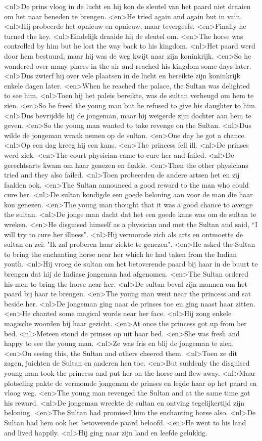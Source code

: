 <nl>De prins vloog in de lucht en hij kon de sleutel van het paard niet draaien om het naar beneden te brengen.
<en>He tried again and again but in vain.
<nl>Hij probeerde het opnieuw en opnieuw, maar tevergeefs.
<en>Finally he turned the key.
<nl>Eindelijk draaide hij de sleutel om.
<en>The horse was controlled by him but he lost the way back to his kingdom.
<nl>Het paard werd door hem bestuurd, maar hij was de weg kwijt naar zijn koninkrijk.
<en>So he wandered over many places in the air and reached his kingdom some days later.
<nl>Dus zwierf hij over vele plaatsen in de lucht en bereikte  zijn koninkrijk enkele dagen later.
<en>When he reached the palace, the Sultan was delighted to see him.
<nl>Toen hij het paleis bereikte, was de sultan verheugd om hem te zien.
<en>So he freed the young man but he refused to give his daughter to him.
<nl>Dus bevrijdde hij de jongeman, maar hij weigerde zijn dochter aan hem te geven.
<en>So the young man wanted to take revenge on the Sultan.
<nl>Dus wilde de jongeman wraak nemen op de sultan.
<en>One day he got a chance.
<nl>Op een dag kreeg hij een kans.
<en>The princess fell ill.
<nl>De prinses werd ziek.
<en>The court physician came to cure her and failed.
<nl>De gerechtsarts kwam om haar genezen en faalde.
<en>Then the other physicians tried and they also failed.
<nl>Toen probeerden de andere artsen het en zij faalden ook.
<en>The Sultan announced a good reward to the man who could cure her.
<nl>De sultan kondigde een goede beloning aan voor de man die haar kon genezen.
<en>The young man thought that it was a good chance to avenge the sultan.
<nl>De jonge man dacht dat het een goede kans was om de sultan te wreken.
<en>He disguised himself as a physician and met the Sultan and said, “I will try to cure her illness".
<nl>Hij vermomde zich als arts en ontmoette de sultan en zei: "Ik zal proberen haar ziekte te genezen".
<en>He asked the Sultan to bring the enchanting horse near her which he had taken from the Indian youth.
<nl>Hij vroeg de sultan om het betoverende paard bij haar in de buurt te brengen dat hij de Indiase jongeman had afgenomen.
<en>The Sultan ordered his men to bring the horse near her.
<nl>De sultan beval zijn mannen om het paard bij haar te brengen.
<en>The young man went near the princess and sat beside her.
<nl>De jongeman ging naar de prinses toe en ging naast haar zitten.
<en>He chanted some magical words near her face.
<nl>Hij zong enkele magische woorden bij haar gezicht.
<en>At once the princess got up from her bed.
<nl>Meteen stond de prinses op uit haar bed.
<en>She was fresh and happy to see the young man.
<nl>Ze was fris en blij de jongeman te zien.
<en>On seeing this, the Sultan and others cheered them.
<nl>Toen ze dit zagen, juichten de Sultan en anderen hen toe.
<en>But suddenly the disguised young man took the princess and put her on the horse and flew away.
<nl>Maar plotseling pakte de vermomde jongeman de prinses en legde haar op het paard en vloog weg.
<en>The young man revenged the Sultan and at the same time got his reward.
<nl>De jongeman wreekte de sultan en ontving tegelijkertijd zijn beloning.
<en>The Sultan had promised him the enchanting horse also.
<nl>De Sultan had hem ook het betoverende paard beloofd.
<en>He went to his land and lived happily.
<nl>Hij ging naar zijn land en leefde gelukkig.

